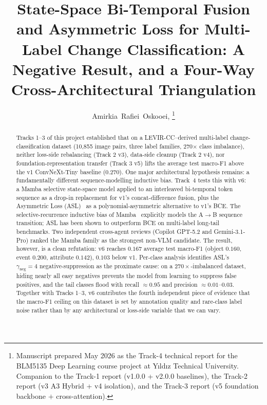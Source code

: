 \documentclass[journal]{IEEEtran}
\begin{document}
\title{State-Space Bi-Temporal Fusion and Asymmetric Loss for Multi-Label Change Classification: A Negative Result, and a Four-Way Cross-Architectural Triangulation}

\author{%
  Amirkia~Rafiei~Oskooei,
  \thanks{Manuscript prepared May 2026 as the Track-4 technical report for the BLM5135 Deep Learning course project at Y\i ld\i z Technical University. Companion to the Track-1 report (v1.0.0 + v2.0.0 baselines), the Track-2 report (v3 A3 Hybrid + v4 isolation), and the Track-3 report (v5 foundation backbone $+$ cross-attention).}
}


\maketitle

\begin{abstract}
Tracks 1--3 of this project established that on a LEVIR-CC--derived multi-label change-classification dataset (10{,}855 image pairs, three label families, 270$\times$ class imbalance), neither loss-side rebalancing (Track 2 v3), data-side cleanup (Track 2 v4), nor foundation-representation transfer (Track 3 v5) lifts the average test macro-F1 above the v1 ConvNeXt-Tiny baseline (0.270). One major architectural hypothesis remains: a fundamentally different sequence-modelling inductive bias. Track~4 tests this with v6: a Mamba selective state-space model applied to an interleaved bi-temporal token sequence as a drop-in replacement for v1's concat-difference fusion, plus the Asymmetric Loss (ASL)~\cite{ridnik2021asl} as a polynomial-asymmetric alternative to v1's BCE. The selective-recurrence inductive bias of Mamba~\cite{gu2023mamba} explicitly models the A$\to$B sequence transition; ASL has been shown to outperform BCE on multi-label long-tail benchmarks. Two independent cross-agent reviews (Copilot GPT-5.2 and Gemini-3.1-Pro) ranked the Mamba family as the strongest non-VLM candidate. The result, however, is a clean refutation: v6 reaches $0.167$ average test macro-F1 (object $0.160$, event $0.200$, attribute $0.142$), $0.103$ below v1. Per-class analysis identifies ASL's $\gamma_\mathrm{neg}{=}4$ negative-suppression as the proximate cause: on a $270{\times}$-imbalanced dataset, hiding nearly all easy negatives prevents the model from learning to suppress false positives, and the tail classes flood with recall $\approx 0.95$ and precision $\approx 0.01$--$0.03$. Together with Tracks 1--3, v6 contributes the fourth independent piece of evidence that the macro-F1 ceiling on this dataset is set by annotation quality and rare-class label noise rather than by any architectural or loss-side variable that we can vary.
\end{abstract}
\end{document}
